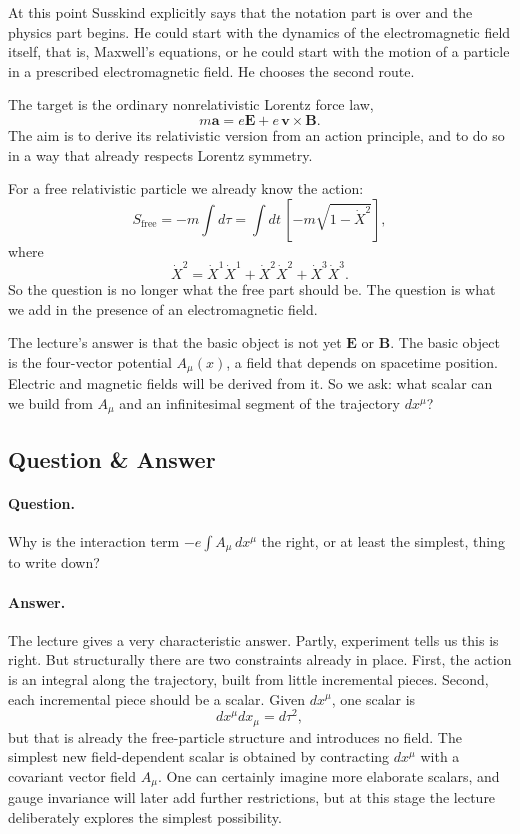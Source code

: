 At this point Susskind explicitly says that the notation part is over and the physics part begins. He could start with the dynamics of the electromagnetic field itself, that is, Maxwell's equations, or he could start with the motion of a particle in a prescribed electromagnetic field. He chooses the second route.

The target is the ordinary nonrelativistic Lorentz force law,
\begin{equation}
m\mathbf a=e\mathbf E+e\,\mathbf v\times\mathbf B.
\end{equation}
The aim is to derive its relativistic version from an action principle, and to do so in a way that already respects Lorentz symmetry.

For a free relativistic particle we already know the action:
\begin{equation}
S_{\mathrm{free}}
=
-m\int d\tau
=
\int dt\,\left[-m\sqrt{1-\dot X^2}\right],
\end{equation}
where
\begin{equation}
\dot X^2=\dot X^1\dot X^1+\dot X^2\dot X^2+\dot X^3\dot X^3.
\end{equation}
So the question is no longer what the free part should be. The question is what we add in the presence of an electromagnetic field.

The lecture's answer is that the basic object is not yet $\mathbf E$ or $\mathbf B$. The basic object is the four-vector potential $A_\mu(x)$, a field that depends on spacetime position. Electric and magnetic fields will be derived from it. So we ask: what scalar can we build from $A_\mu$ and an infinitesimal segment of the trajectory $dx^\mu$?

\subsection{Question \& Answer}

\paragraph{Question.} Why is the interaction term $-e\int A_\mu\,dx^\mu$ the right, or at least the simplest, thing to write down?

\paragraph{Answer.} The lecture gives a very characteristic answer. Partly, experiment tells us this is right. But structurally there are two constraints already in place. First, the action is an integral along the trajectory, built from little incremental pieces. Second, each incremental piece should be a scalar. Given $dx^\mu$, one scalar is
\[
dx^\mu dx_\mu = d\tau^2,
\]
but that is already the free-particle structure and introduces no field. The simplest new field-dependent scalar is obtained by contracting $dx^\mu$ with a covariant vector field $A_\mu$. One can certainly imagine more elaborate scalars, and gauge invariance will later add further restrictions, but at this stage the lecture deliberately explores the simplest possibility.


